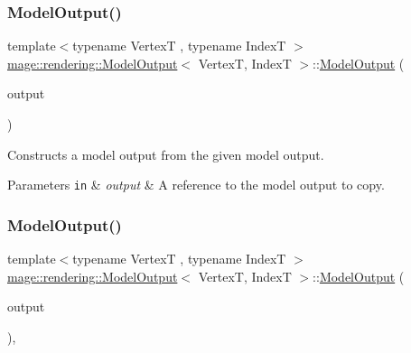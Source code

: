 \subsubsection{\texorpdfstring{Model\+Output()}{ModelOutput()}\hspace{0.1cm}{\footnotesize\ttfamily [2/3]}}
{\footnotesize\ttfamily template$<$typename VertexT , typename IndexT $>$ \\
\mbox{\hyperlink{structmage_1_1rendering_1_1_model_output}{mage\+::rendering\+::\+Model\+Output}}$<$ VertexT, IndexT $>$\+::\mbox{\hyperlink{structmage_1_1rendering_1_1_model_output}{Model\+Output}} (\begin{DoxyParamCaption}\item[{const \mbox{\hyperlink{structmage_1_1rendering_1_1_model_output}{Model\+Output}}$<$ VertexT, IndexT $>$ \&}]{output }\end{DoxyParamCaption})\hspace{0.3cm}{\ttfamily [delete]}}

Constructs a model output from the given model output.


\begin{DoxyParams}[1]{Parameters}
\mbox{\tt in}  & {\em output} & A reference to the model output to copy. \\
\hline
\end{DoxyParams}
\mbox{\label{structmage_1_1rendering_1_1_model_output_a449de2164c45500f02bbe03f4bdc648f}} 
\subsubsection{\texorpdfstring{Model\+Output()}{ModelOutput()}\hspace{0.1cm}{\footnotesize\ttfamily [3/3]}}
{\footnotesize\ttfamily template$<$typename VertexT , typename IndexT $>$ \\
\mbox{\hyperlink{structmage_1_1rendering_1_1_model_output}{mage\+::rendering\+::\+Model\+Output}}$<$ VertexT, IndexT $>$\+::\mbox{\hyperlink{structmage_1_1rendering_1_1_model_output}{Model\+Output}} (\begin{DoxyParamCaption}\item[{\mbox{\hyperlink{structmage_1_1rendering_1_1_model_output}{Model\+Output}}$<$ VertexT, IndexT $>$ \&\&}]{output }\end{DoxyParamCaption})\hspace{0.3cm}{\ttfamily [default]}, {\ttfamily [noexcept]}}

